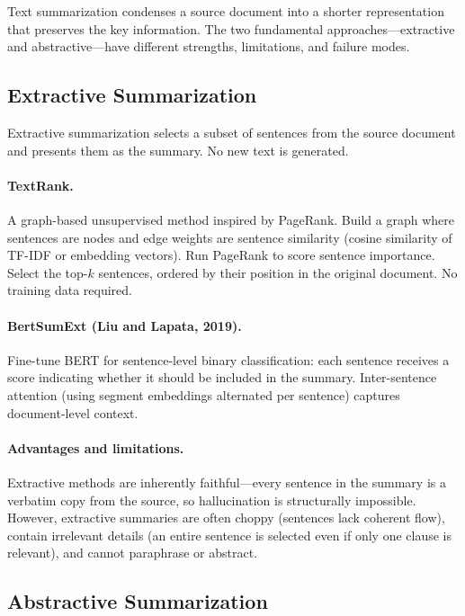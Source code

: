 Text summarization condenses a source document into a shorter representation that preserves
the key information.  The two fundamental approaches---extractive and abstractive---have
different strengths, limitations, and failure modes.

\subsection{Extractive Summarization}

Extractive summarization selects a subset of sentences from the source document and presents
them as the summary.  No new text is generated.

\paragraph{TextRank.}
A graph-based unsupervised method inspired by PageRank.  Build a graph where sentences are
nodes and edge weights are sentence similarity (cosine similarity of TF-IDF or embedding
vectors).  Run PageRank to score sentence importance.  Select the top-$k$ sentences, ordered
by their position in the original document.  No training data required.

\paragraph{BertSumExt (Liu and Lapata, 2019).}
Fine-tune BERT for sentence-level binary classification: each sentence receives a score
indicating whether it should be included in the summary.  Inter-sentence attention (using
segment embeddings alternated per sentence) captures document-level context.

\paragraph{Advantages and limitations.}
Extractive methods are inherently faithful---every sentence in the summary is a verbatim copy
from the source, so hallucination is structurally impossible.  However, extractive summaries
are often choppy (sentences lack coherent flow), contain irrelevant details (an entire sentence
is selected even if only one clause is relevant), and cannot paraphrase or abstract.

\subsection{Abstractive Summarization}

